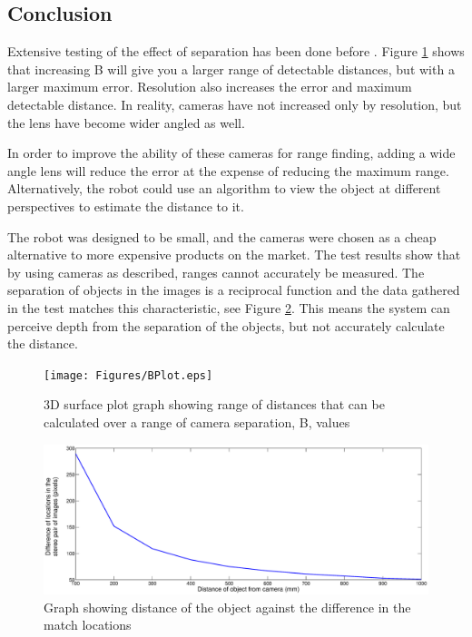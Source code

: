 \subsection{Conclusion}

Extensive testing of the effect of separation has been done before \citep{Mrovlje:Distance_Stereoscopic}. Figure \ref{fig:B:Plot} shows that increasing B will give you a larger range of detectable distances, but with a larger maximum error. Resolution also increases the error and maximum detectable distance. In reality, cameras have not increased only by resolution, but the lens have become wider angled as well. 

In order to improve the ability of these cameras for range finding, adding a wide angle lens will reduce the error at the expense of reducing the maximum range. Alternatively, the robot could use an algorithm to view the object at different perspectives to estimate the distance to it. 

The robot was designed to be small, and the cameras were chosen as a cheap alternative to more expensive products on the market. The test results show that by using cameras as described, ranges cannot accurately be measured. The separation of objects in the images is a reciprocal function and the data gathered in the test matches this characteristic, see Figure \ref{fig:Distance:DeltaX}. This means the system can perceive depth from the separation of the objects, but not accurately calculate the distance. 

\begin{figure}
\texttt{[image: Figures/BPlot.eps]}
\caption{3D surface plot graph showing range of distances that can be calculated over a range of camera separation, B, values}
\label{fig:B:Plot}
\end{figure}
\begin{figure}
\includegraphics[width=\textwidth]{Figures/Distance_DeltaX.eps}
\caption{Graph showing distance of the object against the difference in the match locations}
\label{fig:Distance:DeltaX}
\end{figure}
